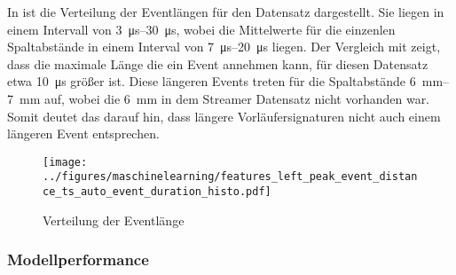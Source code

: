 In  ist die Verteilung der Eventlängen für den Datensatz dargestellt. Sie liegen in einem Intervall von \SIrange{3}{30}{\micro\second}, wobei die Mittelwerte für die einzenlen Spaltabstände in einem Interval von \SIrange{7}{20}{\micro\second} liegen. Der Vergleich mit  zeigt, dass die maximale Länge die ein Event annehmen kann, für diesen Datensatz etwa \SI{10}{\micro\second} größer ist. Diese längeren Events treten für die Spaltabstände \SIrange{6}{7}{\milli\meter} auf, wobei die \SI{6}{\milli\meter} in dem Streamer Datensatz nicht vorhanden war. Somit deutet das darauf hin, dass längere Vorläufersignaturen nicht auch einem längeren Event entsprechen. 
\begin{figure}[H]
    \centering
      \texttt{[image: ../figures/maschinelearning/features\_left\_peak\_event\_distance\_ts\_auto\_event\_duration\_histo.pdf]}
      \caption{Verteilung der Eventlänge}
      \label{fig:event_left_event_duration_box}
\end{figure}


\subsubsection{Modellperformance}

\begin{table}[h!]
\centering
\caption{Model Performance für die Vorhersage der Eventlänge}
\label{tab:short_event_duration}
\end{table}


